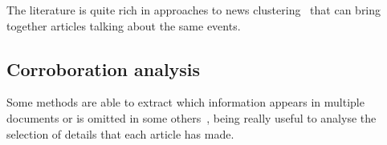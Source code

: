 





The literature is quite rich in approaches to news clustering~\cite{carpineto2009survey,jones1972statistical} %
that can bring together articles talking about the same events.



\subsection{Corroboration analysis}
\label{ssec:lit_relationships_corroboration}

Some methods are able to extract which information appears in multiple documents or is omitted in some others~\cite{bountouridis2018explaining}, being really useful to analyse the selection of details that each article has made.

